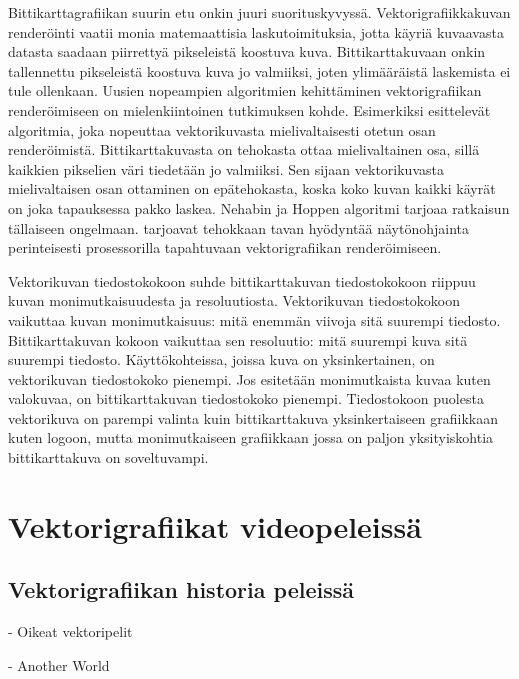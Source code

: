 \documentclass[utf8,bachelor]{gradu3}
\begin{document}
Bittikarttagrafiikan suurin etu onkin juuri suorituskyvyssä. Vektorigrafiikkakuvan renderöinti vaatii monia matemaattisia laskutoimituksia, jotta käyriä kuvaavasta datasta saadaan piirrettyä pikseleistä koostuva kuva. Bittikarttakuvaan onkin tallennettu pikseleistä koostuva kuva jo valmiiksi, joten ylimääräistä laskemista ei tule ollenkaan. \parencite{RefWorks:doc:5bdc5292e4b05afcfde5b171} Uusien nopeampien algoritmien kehittäminen vektorigrafiikan renderöimiseen on mielenkiintoinen tutkimuksen kohde. Esimerkiksi \textcite{RefWorks:doc:5bdf538de4b04939ba18218f} esittelevät algoritmia, joka nopeuttaa vektorikuvasta mielivaltaisesti otetun osan renderöimistä. Bittikarttakuvasta on tehokasta ottaa mielivaltainen osa, sillä kaikkien pikselien väri tiedetään jo valmiiksi. Sen sijaan vektorikuvasta mielivaltaisen osan ottaminen on epätehokasta, koska koko kuvan kaikki käyrät on joka tapauksessa pakko laskea. Nehabin ja Hoppen algoritmi tarjoaa ratkaisun tällaiseen ongelmaan. \parencite{RefWorks:doc:5bdf538de4b04939ba18218f} \textcite{RefWorks:doc:5bc4a5cce4b080e02f7eff1b} tarjoavat tehokkaan tavan hyödyntää näytönohjainta perinteisesti prosessorilla tapahtuvaan vektorigrafiikan renderöimiseen.

Vektorikuvan tiedostokokoon suhde bittikarttakuvan tiedostokokoon riippuu kuvan monimutkaisuudesta ja resoluutiosta. Vektorikuvan tiedostokokoon vaikuttaa kuvan monimutkaisuus: mitä enemmän viivoja sitä suurempi tiedosto. Bittikarttakuvan kokoon vaikuttaa sen resoluutio: mitä suurempi kuva sitä suurempi tiedosto. Käyttökohteissa, joissa kuva on yksinkertainen, on vektorikuvan tiedostokoko pienempi. Jos esitetään monimutkaista kuvaa kuten valokuvaa, on bittikarttakuvan tiedostokoko pienempi. Tiedostokoon puolesta vektorikuva on parempi valinta kuin bittikarttakuva yksinkertaiseen grafiikkaan kuten logoon, mutta monimutkaiseen grafiikkaan jossa on paljon yksityiskohtia bittikarttakuva on soveltuvampi. \parencite{RefWorks:doc:5bdf4af9e4b0f02deeb8a48a}

\chapter{Vektorigrafiikat videopeleissä}

\section{Vektorigrafiikan historia peleissä}

- Oikeat vektoripelit

- Another World
\end{document}
